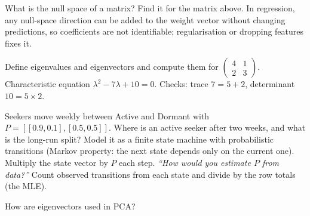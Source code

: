 \begin{qa}{ What is the null space of a matrix? Find it for the matrix above.}
\why In regression, any null-space direction can be added to the weight vector without changing predictions, so coefficients are not identifiable; regularisation or dropping features fixes it.
\end{qa}

\begin{qa}{ Define eigenvalues and eigenvectors and compute them for $\begin{pmatrix}4 & 1\\2 & 3\end{pmatrix}$.}
\why Characteristic equation $\lambda^2 - 7\lambda + 10 = 0$. Checks: trace $7 = 5 + 2$, determinant $10 = 5\times2$.
\end{qa}

\begin{qa}{ Seekers move weekly between Active and Dormant with $P = [[0.9, 0.1], [0.5, 0.5]]$. Where is an active seeker after two weeks, and what is the long-run
split?}
\why Model it as a finite state machine with probabilistic transitions (Markov property: the next state depends only on the current one). Multiply the state vector by $P$ each step.
\pushes \emph{``How would you estimate $P$ from data?''} Count observed transitions from each state and divide by the row totals (the MLE).
\end{qa}

\begin{qa}{How are eigenvectors used in PCA?}
\end{qa}

